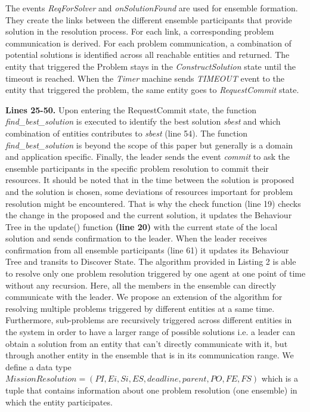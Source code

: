 \documentclass[journal]{IEEEtran}
\theoremstyle{definition}
\begin{document}
The events \textit{ReqForSolver} and \textit{onSolutionFound} are used for ensemble formation. 
They create the links between the different ensemble participants that provide solution in the resolution process. For each link, a corresponding problem communication is derived. For each problem communication, a combination of potential solutions is identified across all reachable entities and returned. The entity that triggered the Problem stays in the \textit{ConstructSolution} state until the timeout is reached. When the \textit{Timer} machine sends \textit{TIMEOUT} event to the entity that triggered the problem, the same entity goes to \textit{RequestCommit} state.

\textbf{Lines 25-50.}
Upon entering the RequestCommit state, the function \textit{find\_best\_solution} is executed to identify the best solution \textit{sbest} and which combination of entities contributes to \textit{sbest} (line 54). The function \textit{find\_best\_solution} is beyond the scope of this paper but generally is a domain and application specific. Finally, the leader sends the event \textit{commit} to ask the ensemble participants in the specific problem resolution to commit their resources. 
It should be noted that in the time between the solution is proposed and the solution is chosen, some deviations of resources important for problem resolution might be encountered. That is why the check function (line 19) checks the change in the proposed and the current solution, it updates the Behaviour Tree in the update() function \textbf{(line 20)} with the current state of the local solution and sends confirmation to the leader. When the leader receives confirmation from all ensemble participants (line 61) it updates its Behaviour Tree and transits to Discover State. 
The algorithm provided in Listing 2 is able to resolve only one problem resolution triggered by one agent at one point of time without any recursion. Here, all the members in the ensemble can directly communicate with the leader. We propose an extension of the algorithm for resolving multiple problems triggered by different entities at a same time. Furthermore, sub-problems are recursively triggered across different entities in the system in order to have a larger range of possible solutions i.e. a leader can obtain a solution from an entity that can't directly communicate with it, but through another entity in the ensemble that is in its communication range. We define a data type  $MissionResolution = (PI, Ei, Si, ES, deadline, parent, PO, FE, FS)$ which is a tuple that contains information about one problem resolution (one ensemble) in which the entity participates.
\end{document}
